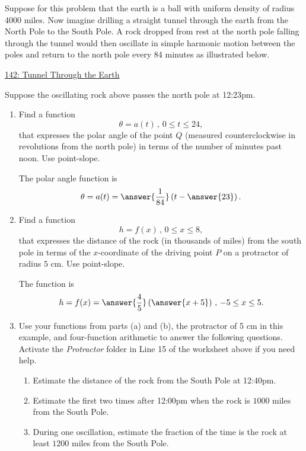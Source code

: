 \documentclass{ximera}
\begin{document}
\begin{example}  \label{Ex:FEfe344trgfd45}

Suppose for this problem that the earth is a ball with uniform density of radius 4000 miles. Now imagine drilling a straight tunnel through the earth from the North Pole to the South Pole. A rock dropped from rest at the north pole falling through the tunnel would then oscillate in simple harmonic motion between the poles and return to the north pole every 84  minutes as illustrated below. %

\begin{onlineOnly}
    \begin{center}
\end{center}
\end{onlineOnly}

\href{https://www.desmos.com/calculator/z5ya8iy2e4}{142: Tunnel Through the Earth }

Suppose the oscillating rock above passes the north pole at 12:23pm.

\begin{enumerate}

\item Find a function
\[
   \theta = a(t) \, , \, 0\leq t \leq 24,
\]
that expresses the polar angle of the point $Q$ (measured counterclockwise in revolutions from the north pole) in terms of the number of minutes past noon. Use point-slope.

The polar angle function is
\[
   \theta = a(t) = \answer{\frac{1}{84}}\left( t - \answer{23} \right).
\]

\item Find a function
\[
   h = f(x) \, , \, 0\leq x \leq 8,
\]
that expresses the distance of the rock (in thousands of miles) from the south pole in terms of the $x$-coordinate of the driving point $P$ on a protractor of radius $5$ cm. Use point-slope.

The function is
\[
     h = f(x) = \answer{\frac{4}{5}} \left(\answer{x+5}\right) \, , \, -5 \leq x \leq 5.
\]

\item Use your functions from parts (a) and (b), the protractor of 5 cm in this example, and four-function arithmetic to answer the following questions. Activate the \emph{Protractor} folder in Line 15 of the worksheet above if you need help. 
\begin{enumerate}

\item Estimate the distance of the rock from the South Pole at 12:40pm.

\item Estimate the first two times after 12:00pm when the rock is $1000$ miles from the South Pole.

\item During one oscillation, estimate the fraction of the time is the rock at least $1200$ miles from the South Pole.
\end{enumerate}

\end{enumerate}
\end{example}
\end{document}
